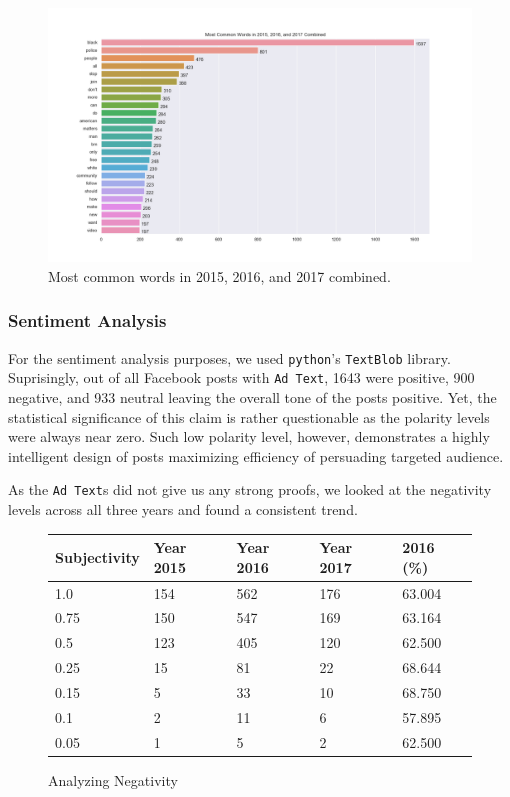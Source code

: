 \documentclass[12pt]{article}
\theoremstyle{definition}
\begin{document}
\begin{figure}[H]
\centering
\includegraphics[width=\columnwidth]{./image/barchart-plots/barchart_word_counts.png}
\caption*{Most common words in 2015, 2016, and 2017 combined.}
\end{figure}


\subsubsection*{\centering Sentiment Analysis}
For the sentiment analysis purposes, we used \texttt{python}'s \texttt{TextBlob}
library. Suprisingly, out of all Facebook posts with \texttt{Ad Text}, 1643 were
positive, 900 negative, and 933 neutral leaving the overall tone of the posts
positive. Yet, the statistical significance of this claim is rather questionable
as the polarity levels were always near zero. Such low polarity level, however,
demonstrates a highly intelligent design of posts maximizing efficiency of
persuading targeted audience.

\bigskip

As the \texttt{Ad Text}s did not give us any strong proofs, we looked at the
negativity levels across all three years and found a consistent trend.

\begin{figure}[H]
\centering
\begin{tabular}{|p{3cm}|p{3cm}|p{3cm}|p{3cm}|p{3cm}|}
 \hline
 Subjectivity & Year 2015 & Year 2016 & Year 2017 & 2016 (\%)\\
 \hline
 1.0  & 154 & 562 & 176 & 63.004\\
 \hline
 0.75 & 150 & 547 & 169 & 63.164\\
 \hline
 0.5  & 123 & 405 & 120 & 62.500\\
 \hline
 0.25 & 15  & 81  & 22  & 68.644\\
 \hline
 0.15 & 5   & 33  & 10  & 68.750\\
 \hline
 0.1  & 2   & 11  & 6   & 57.895\\
 \hline
 0.05 & 1   & 5   & 2   & 62.500\\
 \hline
\end{tabular}
\caption*{Analyzing Negativity}
\end{figure}
\end{document}
